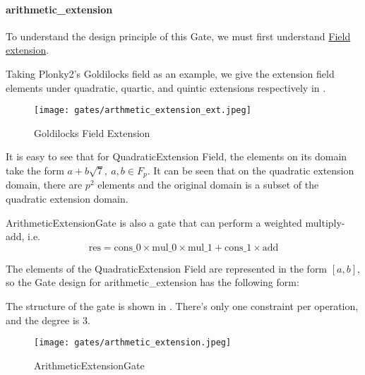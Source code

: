 \paragraph{arithmetic\_extension}

\hspace*{\fill}

\indent To understand the design principle of this Gate, we must first understand \href{https://en.wikipedia.org/wiki/Field_extension#Extension_field}{Field extension}. 

Taking Plonky2's Goldilocks field as an example, we give the extension field elements under quadratic, quartic, and quintic extensions respectively in .

\begin{figure}[!ht]
    \centering
    \texttt{[image: gates/arthmetic\_extension\_ext.jpeg]}
    \caption{Goldilocks Field Extension}
    \label{fig:goldilocks field extension}
\end{figure}

It is easy to see that for QuadraticExtension Field, the elements on its domain take the form $a+b\sqrt{7}, \ a,b \in F_p$.
It can be seen that on the quadratic extension domain, there are $p^2$ elements and the original domain is a subset of the quadratic extension domain.

ArithmeticExtensionGate is also a gate that can perform a weighted multiply-add, i.e.
\[ \text{res} = \text{cons\_0} \times \text{mul\_0} \times \text{mul\_1} + \text{cons\_1} \times \text{add} \]

The elements of the QuadraticExtension Field are represented in the form $[a, b]$, so the Gate design for arithmetic\_extension has the following form:

The structure of the gate is shown in . There's only one constraint per operation, and the degree is 3.
\begin{figure}[!ht]
    \centering
    \texttt{[image: gates/arthmetic\_extension.jpeg]}
    \caption{ArithmeticExtensionGate}
    \label{fig:arthmetic-extension}
\end{figure}